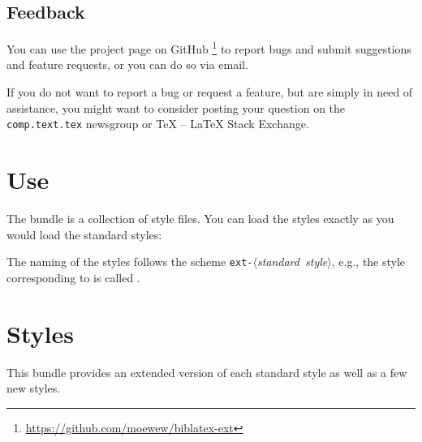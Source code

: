 \documentclass[DIV=9]{scrartcl}
\def\tex{TeX}%
\def\latex{LaTeX}%
\newcommand*{\gitbaseurl}{https://github.com/moewew/biblatex-ext}
\begin{document}
\subsection{Feedback}\label{sec:feedback}

You can use the  project page on GitHub%
\footnote{\url{\gitbaseurl}} to report bugs and
submit suggestions and feature requests, or you can do so via email.

If you do not want to report a bug or request a feature, but are simply in need
of assistance, you might want to consider posting your question on the
\texttt{comp.text.tex} newsgroup or \tex{} -- \latex{} Stack Exchange.%

\section{Use}\label{sec:use}

The  bundle is a collection of  style files.
You can load the styles exactly as you would load the standard styles:
\begin{biblatexcode}
\usepackage[style=(*@$\langle$\normalfont\emph{style}$\rangle$@*)]{biblatex}
\end{biblatexcode}
The naming of the styles follows the scheme
\mbox{\texttt{ext-}$\langle$\emph{standard style}$\rangle$}, e.g.,
the style corresponding to  is called
.

\section{Styles}\label{sec:styles}
This bundle provides an extended version of each standard style as well as a
few new styles.
\end{document}
